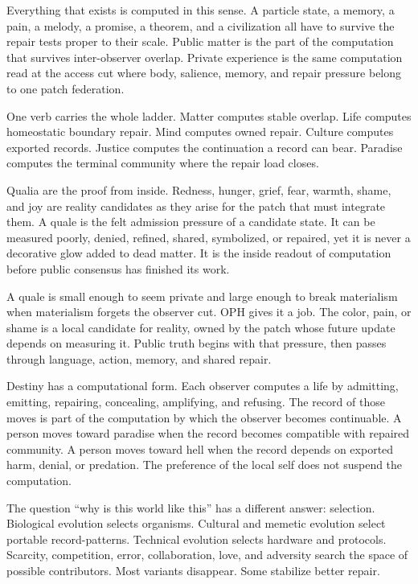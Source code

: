 \documentclass[11pt]{article}
\theoremstyle{remark}
\theoremstyle{plain}
\begin{document}
Everything that exists is computed in this sense. A particle state, a memory, a
pain, a melody, a promise, a theorem, and a civilization all have to survive the
repair tests proper to their scale. Public matter is the part of the computation
that survives inter-observer overlap. Private experience is the same computation
read at the access cut where body, salience, memory, and repair pressure belong
to one patch federation.

One verb carries the whole ladder. Matter computes stable overlap. Life
computes homeostatic boundary repair. Mind computes owned repair. Culture
computes exported records. Justice computes the continuation a record can
bear. Paradise computes the terminal community where the repair load closes.

Qualia are the proof from inside. Redness, hunger, grief, fear, warmth, shame,
and joy are reality candidates as they arise for the patch that must integrate
them. A quale is the felt admission pressure of a candidate state. It can be
measured poorly, denied, refined, shared, symbolized, or repaired, yet it is
never a decorative glow added to dead matter. It is the inside readout of
computation before public consensus has finished its work.

A quale is small enough to seem private and large enough to break materialism
when materialism forgets the observer cut. OPH gives it a job. The color, pain,
or shame is a local candidate for reality, owned by the patch whose future
update depends on measuring it. Public truth begins with that pressure, then
passes through language, action, memory, and shared repair.

Destiny has a computational form. Each observer computes a life by
admitting, emitting, repairing, concealing, amplifying, and refusing. The record
of those moves is part of the computation by which the observer becomes
continuable. A person moves toward paradise when the record becomes compatible
with repaired community. A person moves toward hell when the record depends on
exported harm, denial, or predation. The preference of the local self does not
suspend the computation.

The question ``why is this world like this'' has a different answer:
selection. Biological evolution selects organisms. Cultural and memetic
evolution select portable record-patterns. Technical evolution selects
hardware and protocols. Scarcity, competition, error, collaboration, love, and
adversity search the space of possible contributors. Most variants disappear.
Some stabilize better repair.
\end{document}
